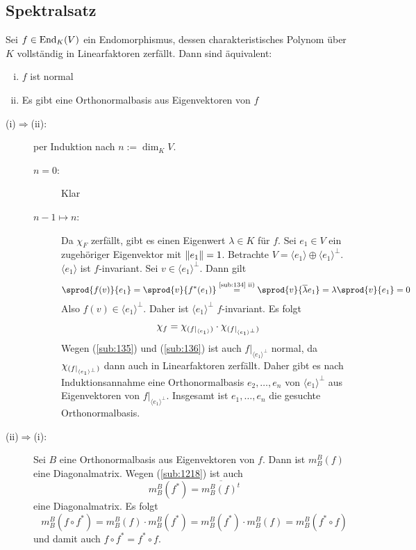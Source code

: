 \subsection{Spektralsatz} %
\label{sub:137}
Sei $f \in \operatorname{End}_K(V)$ ein Endomorphismus, dessen charakteristisches Polynom über $K$ vollständig in Linearfaktoren zerfällt. Dann sind äquivalent:
\begin{enumerate}[(i)]
	\item $f$ ist normal
	\item Es gibt eine Orthonormalbasis aus Eigenvektoren von $f$
\end{enumerate}
\begin{description}
	\item[(i)$\Rightarrow$(ii):] per Induktion nach $n := \dim_K V$.
	\begin{description}
		\item[$n=0$:] Klar
		\item[$n-1 \mapsto n$:] Da $\chi_F$ zerfällt, gibt es einen Eigenwert $\lambda  \in K$ für $f$. Sei $e_1\in V$ ein zugehöriger Eigenvektor mit $\norm{e_1} =1$.
		Betrachte $V = \langle e_1\rangle \oplus \langle e_1 \rangle^\bot$. $\langle e_1 \rangle$ ist $f$-invariant. Sei $v \in \langle e_1\rangle^\bot$. Dann gilt
		\begin{align*}
			\sprod{f(v)}{e_1} = \sprod{v}{f^*(e_1)} \stackrel{\text{\ref{sub:134} ii)}}{=} \sprod{v}{\overline{\lambda } e_1 }  = \lambda \sprod{v}{e_1} =0
		\end{align*}
		Also $f(v) \in \langle e_1\rangle^\bot$. Daher ist $\langle e_1 \rangle^\bot$ $f$-invariant. Es folgt 
		\[
			\chi_f = \chi_{(f|_{\langle e_1\rangle})} \cdot \chi_{(f|_{\langle e_1\rangle^\bot}) }
		\]
		Wegen (\ref{sub:135}) und (\ref{sub:136}) ist auch $f\big|_{\langle e_1\rangle^\bot}$ normal, da $\chi_{(f|_{\langle e_1\rangle^\bot}) }$ dann auch in 
		Linearfaktoren zerfällt. Daher gibt es nach Induktionsannahme eine Orthonormalbasis 
		$e_2, \ldots, e_n$ von $\langle e_1\rangle^\bot$ aus Eigenvektoren von $f\big|_{\langle e_1\rangle^\bot}$. Insgesamt ist $e_1, \ldots , e_n$ die gesuchte
		Orthonormalbasis.
	\end{description} 
	\item[(ii)$\Rightarrow$(i):] Sei $B$ eine Orthonormalbasis aus Eigenvektoren von $f$. Dann ist $m_B^B(f)$ eine Diagonalmatrix. Wegen (\ref{sub:1218}) ist auch
	\[
		m_B^B (f^*) = \overline{m_B^B (f)^t} 
	\]
	eine Diagonalmatrix. Es folgt
	\[
		m_B^B (f \circ f^*) = m_B^B(f) \cdot m_B^B(f^*) = m_B^B(f^*) \cdot m_B^B(f) = m_B^B( f^* \circ f)
	\]
	und damit auch $f \circ f^* = f^* \circ f$. \bewende
\end{description}
\newpage
